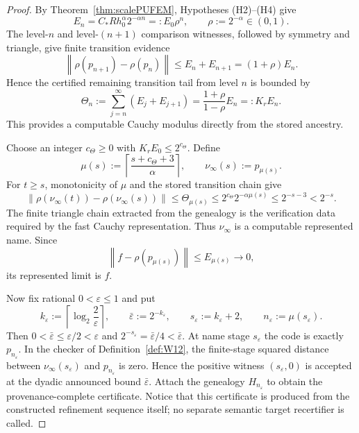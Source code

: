 \documentclass[11pt]{article}
\theoremstyle{definition}
\newcommand{\norm}[1]{\left\lVert #1 \right\rVert}
\begin{document}
\begin{proof}
By Theorem~\ref{thm:scalePUFEM}, Hypotheses (H2)--(H4) give
\[
 E_n=C_*Rh_0^\alpha 2^{-\alpha n}=:E_0\rho^n,
 \qquad \rho:=2^{-\alpha}\in(0,1).
\]
The level-$n$ and level-$(n+1)$ comparison witnesses, followed by symmetry and triangle,
give finite transition evidence
\[
 \norm{\rho(p_{n+1})-\rho(p_n)}
 \le E_n+E_{n+1}
 =(1+\rho)E_n.
\]
Hence the certified remaining transition tail from level $n$ is bounded by
\[
 \Theta_n
 :=\sum_{j=n}^{\infty}(E_j+E_{j+1})
 =\frac{1+\rho}{1-\rho}E_n
 =:K_rE_n.
\]
This provides a computable Cauchy modulus directly from the stored ancestry.

Choose an integer $c_\Theta\ge0$ with
$K_rE_0\le2^{c_\Theta}$.  Define
\[
 \mu(s)
 :=\left\lceil\frac{s+c_\Theta+3}{\alpha}\right\rceil,
 \qquad
 \nu_\infty(s):=p_{\mu(s)}.
\]
For $t\ge s$, monotonicity of $\mu$ and the stored transition chain give
\[
 \norm{\rho(\nu_\infty(t))-\rho(\nu_\infty(s))}
 \le\Theta_{\mu(s)}
 \le2^{c_\Theta}2^{-\alpha\mu(s)}
 \le2^{-s-3}<2^{-s}.
\]
The finite triangle chain extracted from the genealogy is the verification data required
by the fast Cauchy representation.  Thus $\nu_\infty$ is a computable represented name.
Since
\[
 \norm{f-\rho(p_{\mu(s)})}\le E_{\mu(s)}\to0,
\]
its represented limit is $f$.

Now fix rational $0<\varepsilon\le1$ and put
\[
 k_\varepsilon:=\left\lceil\log_2\frac2\varepsilon\right\rceil,
 \qquad
 \bar\varepsilon:=2^{-k_\varepsilon},
 \qquad
 s_\varepsilon:=k_\varepsilon+2,
 \qquad
 n_\varepsilon:=\mu(s_\varepsilon).
\]
Then $0<\bar\varepsilon\le\varepsilon/2<\varepsilon$ and
$2^{-s_\varepsilon}=\bar\varepsilon/4<\bar\varepsilon$.  At name stage
$s_\varepsilon$ the code is exactly $p_{n_\varepsilon}$.  In the checker of
Definition~\ref{def:W12}, the finite-stage squared distance between
$\nu_\infty(s_\varepsilon)$ and $p_{n_\varepsilon}$ is zero.  Hence the positive
witness $(s_\varepsilon,0)$ is accepted at the dyadic announced bound
$\bar\varepsilon$.  Attach the genealogy
$H_{n_\varepsilon}$ to obtain the provenance-complete certificate.  Notice that this
certificate is produced from the constructed refinement sequence itself; no separate
semantic target recertifier is called.


\end{proof}
\end{document}
